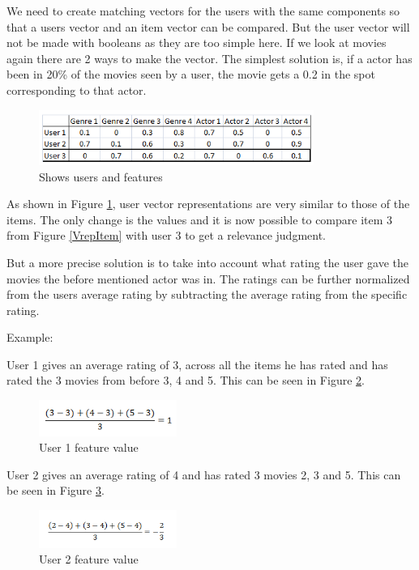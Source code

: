 We need to create matching vectors for the users with the same components so that a users vector and an item vector can be compared. But the user vector will not be made with booleans as they are too simple here. If we look at movies again there are 2 ways to make the vector. The simplest solution is, if a actor has been in 20\% of the movies seen by a user, the movie gets a 0.2 in the spot corresponding to that actor.

\begin{figure}[H]
\centering
\includegraphics[width=0.8\textwidth]{Images/VectorrepresentationUsers.png}
\caption{Shows users and features}
\label{VrepUser}
\end{figure}

As shown in Figure \ref{VrepUser}, user vector representations are very similar to those of the items. The only change is the values and it is now possible to compare item 3 from Figure \ref{VrepItem} with user 3 to get a relevance judgment.

But a more precise solution is to take into account what rating the user gave the movies the before mentioned actor was in. The ratings can be further normalized from the users average rating by subtracting the average rating from the specific rating.

Example:

User 1 gives an average rating of 3, across all the items he has rated and has rated the 3 movies from before 3, 4 and 5. This can be seen in Figure \ref{Feature1}.

\begin{figure}[H]
\centering
\includegraphics[width=0.4\textwidth]{Images/Userfeature1.png}
\caption{User 1 feature value}
\label{Feature1}
\end{figure}

User 2 gives an average rating of 4 and has rated 3 movies 2, 3 and 5. This can be seen in Figure \ref{Feature2}.

\begin{figure}[H]
\centering
\includegraphics[width=0.4\textwidth]{Images/Userfeature2.png}
\caption{User 2 feature value}
\label{Feature2}
\end{figure}

